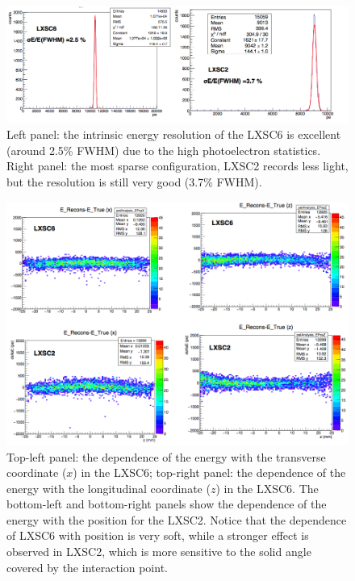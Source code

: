 \documentclass[a4paper,11pt,oneside]{article}
\begin{document}
\begin{figure}[!htb]
	\centering
	\includegraphics[scale=0.5]{img/energyResolution.png}
	\caption{\label{fig.energy}  Left panel: the intrinsic energy resolution of the LXSC6 is excellent (around 2.5\% FWHM) due to the high photoelectron statistics. Right panel: the most sparse configuration, LXSC2 records less light, but the resolution is still very good (3.7\% FWHM). }
\end{figure}

\begin{figure}[!htb]
	\centering
	\includegraphics[scale=0.5]{img/EnergyPos.png}
	\caption{\label{fig.energyDep}  Top-left panel: the dependence of the energy with the transverse coordinate ($x$) in the LXSC6; top-right panel: the dependence of the energy with the longitudinal coordinate ($z$) in the LXSC6. The bottom-left and bottom-right panels show the dependence of the energy with the position for the LXSC2. Notice that the dependence of LXSC6 with position is very soft, while a stronger effect is observed in LXSC2, which is more sensitive to the solid angle covered by the interaction point.}
\end{figure}
\end{document}
